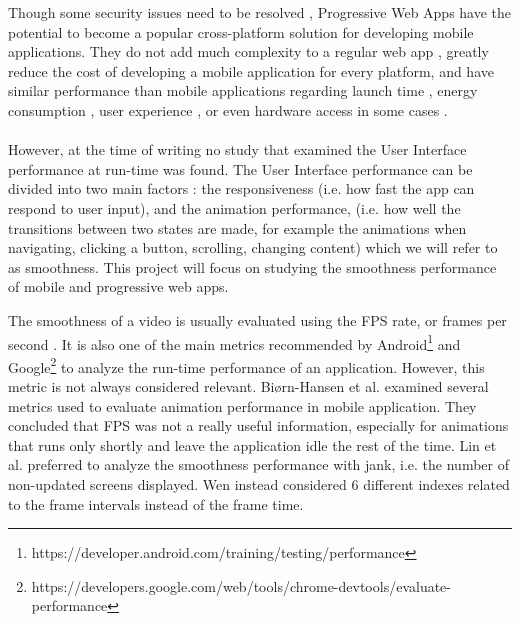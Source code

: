 \documentclass{kththesis}
\begin{document}
Though some security issues need to be resolved \cite{Pride_Prejudice}, Progressive Web Apps have the potential to become a popular cross-platform solution for developing mobile applications. They do not add much complexity to a regular web app \cite{JohannsenFabian2018PWAa}, greatly reduce the cost of developing a mobile application for every platform, and have similar performance than mobile applications regarding launch time \cite{PWApossibleUnifer}\cite{Biorn-Hansen2} \cite{PWAapplicability}, energy consumption \cite{PWAapplicability}, user experience \cite{emulating_native_w_crossplatform}\cite{PWA_UX_comparison_study}, or even hardware access in some cases \cite{PWAbc_responsetime}. 
\paragraph{}

However, at the time of writing no study that examined the User Interface performance at run-time was found. The User Interface performance can be divided into two main factors : the responsiveness (i.e. how fast the app can respond to user input), and the animation performance, (i.e. how well the transitions between two states are made, for example the animations when navigating, clicking a button, scrolling, changing content) which we will refer to as smoothness. This project will focus on studying the smoothness performance of mobile and progressive web apps.

The smoothness of a video is usually evaluated using the FPS rate, or frames per second \cite{smooth_gui}. It is also one of the main metrics recommended by Android\footnote{https://developer.android.com/training/testing/performance} and Google\footnote{https://developers.google.com/web/tools/chrome-devtools/evaluate-performance} to analyze the run-time performance of an application.\newline
However, this metric is not always considered relevant. Biørn-Hansen et al. \cite{animation_performance} examined several metrics used to evaluate animation performance in mobile application. They concluded that FPS was not a really useful information, especially for animations that runs only shortly and leave the application idle the rest of the time. Lin et al.\cite{smooth_gui} preferred to 
analyze the smoothness performance with jank, i.e. the number of non-updated screens displayed. Wen \cite{smoothnessQoE} instead considered 6 different indexes related to the frame intervals instead of the frame time. 
\end{document}
